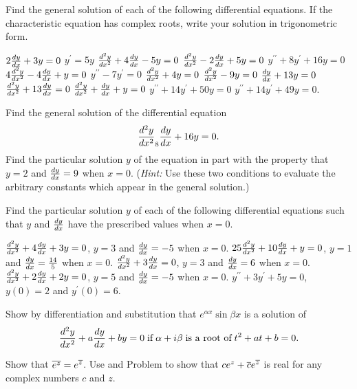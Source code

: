 \begin{exercises}

Find the general solution of each of the following
differential equations.
If the characteristic equation has complex roots,
write your solution in trigonometric form.
\begin{exenum}
\x
$2\frac{d y}{d x} + 3y = 0$
\x
$y^\prime = 5y$
\x
$\frac{d^{2}{y}}{dx^{2}} + 4 \frac{d y}{d x} - 5y = 0$
\x
$\frac{d^{2}{y}}{dx^{2}} - 2 \frac{d y}{d x} + 5y = 0$
\x
$y^{\prime\prime} + 8y^\prime + 16y = 0$
\x
$4 \frac{d^{2}{y}}{dx^{2}} - 4 \frac{d y}{d x} + y = 0$
\x
$y^{\prime\prime} - 7y^{\prime} = 0$
\x
$\frac{d^{2}{y}}{dx^{2}} + 4y = 0$
\x
$\frac{d^{2}{y}}{dx^{2}} - 9y = 0$
\x
$\frac{d y}{d x} + 13y = 0$
\x
$\frac{d^{2}{y}}{dx^{2}} + 13 \frac{d y}{d x} = 0$
\x
$\frac{d^{2}{y}}{dx^{2}} + \frac{d y}{d x} + y = 0$
\x
$y^{\prime\prime} + 14y^\prime + 50y = 0$
\x
$y^{\prime\prime} + 14y^\prime + 49y = 0$.
\end{exenum}

\begin{exenum}
\x
{}
Find the general solution of the differential equation
\[
\frac{d^{2}{y}}{dx^{2}} _ 8\frac{d y}{d x} + 16y = 0
.
\]
\x
Find the particular solution $y$ of the equation
in part  with the property that
$y = 2$ and $\frac{d y}{d x} = 9$ when $x = 0$.
(\emph{Hint:} Use these two conditions to
evaluate the arbitrary constants which appear
in the general solution.)
\end{exenum}

Find the particular solution $y$ of each of the following
differential equations such that $y$ and $\frac{d y}{d x}$
have the prescribed values when $x=0$.
\begin{exenum}
\x
$\frac{d^{2}{y}}{dx^{2}} + 4\frac{d y}{d x} + 3y = 0$, \quad
$y=3$ and $\frac{d y}{d x}=-5$ when $x=0$.
\x
$25\frac{d^{2}{y}}{dx^{2}} + 10\frac{d y}{d x} + y = 0$, \quad
$y=1$ and $\frac{d y}{d x} = \frac{14}5$ when $x=0$.
\x
$\frac{d^{2}{y}}{dx^{2}} + 3\frac{d y}{d x} = 0$, \quad
$y=3$ and $\frac{d y}{d x} = 6$ when $x=0$.
\x
$\frac{d^{2}{y}}{dx^{2}} + 2\frac{d y}{d x} + 2y = 0$, \quad
$y=5$ and $\frac{d y}{d x} = -5$ when $x=0$.
\x
$y^{\prime\prime} + 3y^\prime + 5y = 0$, \quad
$y(0) = 2$ and $y^\prime(0) = 6$.
\end{exenum}

Show by differentiation and substitution that
$e^{\alpha x}\sin \beta x$ is a solution of
\[
\frac{d^{2}{y}}{dx^{2}} + a \frac{d y}{d x} + by = 0 \; \mbox{if}\; \alpha + i\beta
\;\mbox{is a root of}\; t^2 + at + b = 0
.
\]

\begin{exenum}
\x
{}
Show that $\overline{e^z} = e^{\overline{z}}$.
\x
Use  and Problem 
to show that $ce^z + \overline{c} e^{\overline{z}}$
is real for any complex numbers $c$ and $z$.
\end{exenum}


\end{exercises}
